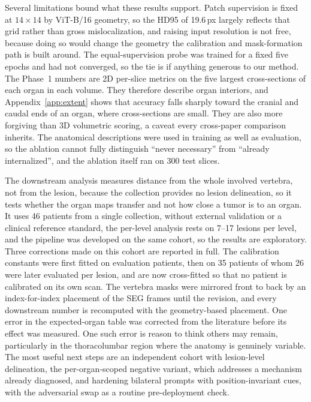 \documentclass[10pt]{article}
\begin{document}
Several limitations bound what these results support. Patch supervision is
fixed at $14\times14$ by ViT-B/16 geometry, so the HD95 of 19.6\,px largely
reflects that grid rather than gross mislocalization, and raising input
resolution is not free, because doing so would change the geometry the
calibration and mask-formation path is built around. The equal-supervision probe
was trained for a fixed five epochs and had not converged, so the tie is if
anything generous to our method. The Phase~1 numbers are 2D per-slice metrics on
the five largest cross-sections of each organ in each volume. They therefore
describe organ interiors, and Appendix~\ref{app:extent} shows that accuracy falls
sharply toward the cranial and caudal ends of an organ, where cross-sections are
small. They are also more forgiving than 3D volumetric scoring, a caveat every
cross-paper comparison inherits. The anatomical descriptions were
used in training as well as evaluation, so the ablation cannot fully distinguish
``never necessary'' from ``already internalized'', and the ablation itself ran
on 300 test slices.

The downstream analysis measures distance from the whole involved vertebra, not
from the lesion, because the collection provides no lesion delineation, so it
tests whether the organ maps transfer and not how close a tumor is to an organ.
It uses 46 patients from a single collection, without external validation or a
clinical reference standard, the per-level analysis rests on 7--17 lesions per
level, and the pipeline was developed on the same cohort, so the results are
exploratory. Three corrections made on this cohort are reported in full. The calibration constants were first fitted on evaluation patients, then
on 35 patients of whom 26 were later evaluated per lesion, and are now
cross-fitted so that no patient is calibrated on its own scan. The vertebra masks
were mirrored front to back by an index-for-index placement of the SEG frames
until the revision, and every downstream number is recomputed with the
geometry-based placement. One error in the expected-organ table was corrected from
the literature before its effect was measured. One such error is reason to think
others may remain, particularly in the thoracolumbar region where the anatomy is
genuinely variable. The most useful next steps are an independent cohort with
lesion-level delineation, the per-organ-scoped negative variant, which addresses a
mechanism already diagnosed, and hardening bilateral prompts with
position-invariant cues, with the adversarial swap as a routine pre-deployment
check.
\end{document}
